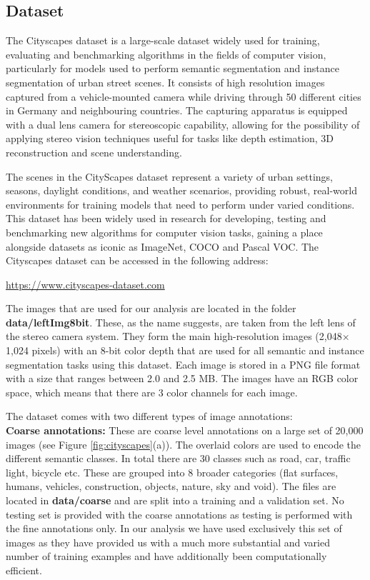 \subsection{Dataset}

The Cityscapes dataset is a large-scale dataset widely used for training, evaluating and benchmarking algorithms in the fields of computer vision, particularly for models used to perform semantic segmentation and instance segmentation of urban street scenes. It consists of high resolution images captured from a vehicle-mounted camera while driving through 50 different cities in Germany and neighbouring countries. The capturing apparatus is equipped with a dual lens camera for stereoscopic capability, allowing for the possibility of applying stereo vision techniques useful for tasks like depth estimation, 3D reconstruction and scene understanding. 

The scenes in the CityScapes dataset represent a variety of urban settings, seasons, daylight conditions, and weather scenarios, providing robust, real-world environments for training models that need to perform under varied conditions. This dataset has been widely used in research for developing, testing and benchmarking new algorithms for computer vision tasks, gaining a place alongside datasets as iconic as ImageNet, COCO and Pascal VOC. The Cityscapes dataset can be accessed in the following address:
\begin{center}
\url{https://www.cityscapes-dataset.com}
\end{center}

The images that are used for our analysis are located in the folder \textbf{data/leftImg8bit}. These, as the name suggests, are taken from the left lens of the stereo camera system. They form the main high-resolution images (2,048$\times$1,024 pixels) with an 8-bit color depth that are used for all semantic and instance segmentation tasks using this dataset. Each image is stored in a PNG file format with a size that ranges between 2.0 and 2.5 MB. The images have an RGB color space, which means that there are 3 color channels for each image.

The dataset comes with two different types of image annotations:\\
\textbf{Coarse annotations:} These are coarse level annotations on a large set of 20,000 images (see Figure \ref{fig:cityscapes}(a)). The overlaid colors are used to encode the different semantic classes. In total there are 30 classes such as road, car, traffic light, bicycle etc. These are grouped into 8 broader categories (flat surfaces, humans, vehicles, construction, objects, nature, sky and void). The files are located in \textbf{data/coarse} and are split into a training and a validation set. No testing set is provided with the coarse annotations as testing is performed with the fine annotations only. In our analysis we have used exclusively this set of images as they have provided us with a much more substantial and varied number of training examples and have additionally been computationally efficient.

